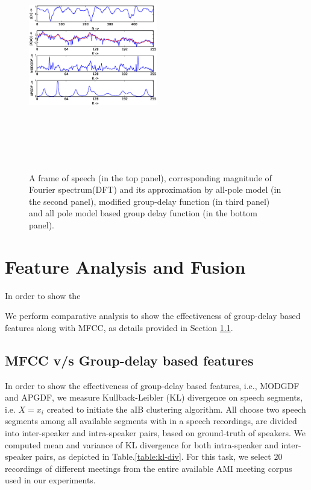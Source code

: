 \documentclass[conference]{IEEEtran}
\begin{document}
\begin{figure}[h]
\centering
\includegraphics[width=0.5\textwidth,height=10cm]{figures/apSpectrum.eps}
\caption{ A frame of speech (in the top panel), corresponding magnitude of Fourier spectrum(DFT) and its approximation by all-pole model (in the second panel), modified group-delay function (in third panel) and all pole model based group delay function (in the bottom panel).}
\label{fig:all-pole}
\end{figure}



\section{Feature Analysis and Fusion}
\label{feature_analysis_and_fusion}

In order to show the 

We perform comparative analysis to show the effectiveness of group-delay based features along with MFCC, as details provided in Section \ref{feature_analysis}. 


\subsection{MFCC v/s Group-delay based features}
\label{feature_analysis}
In order to show the effectiveness of group-delay based features, i.e., MODGDF and APGDF, we measure Kullback-Leibler (KL) divergence on speech segments, i.e. $X={x_i}$ created to initiate the aIB clustering algorithm. All choose two speech segments among all available segments with in a speech recordings, are divided into inter-speaker and intra-speaker pairs, based on ground-truth of speakers. We computed mean and variance of KL divergence for both intra-speaker and inter-speaker pairs, as depicted in Table.\ref{table:kl-div}. For this task, we select $20$ recordings of different meetings from the entire available AMI meeting corpus used in our experiments. 
\end{document}
